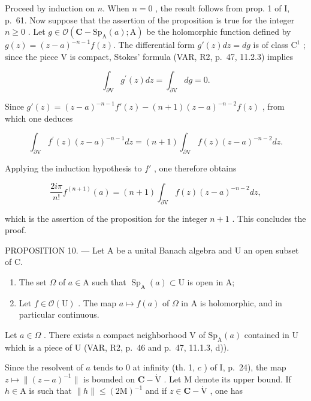 Proceed by induction on \(n\). When \(n = 0\) , the result follows from prop. 1 of I, p.~61. Now suppose that the assertion of the proposition is true for the integer \(n \geqslant 0\) . Let \(g \in \mathcal{O}(\mathbf{C} - \mathrm{Sp}_{\mathrm{A}}(a); \mathrm{A})\) be the holomorphic function defined by \(g(z) = (z - a)^{-n-1} f(z)\). The differential form \(g'(z) dz = dg\) is of class \(\mathrm{C}^1\) ; since the piece V is compact, Stokes' formula (VAR, R2, p.~47, 11.2.3) implies

\[
\int_ {\partial \mathrm{V}} g ^ {\prime} (z) d z = \int_ {\partial \mathrm{V}} d g = 0.
\]

Since \(g'(z) = (z - a)^{-n-1} f'(z) - (n+1)(z - a)^{-n-2} f(z)\) , from which one deduces

\[
\int_ {\partial \mathrm{V}} f ^ {\prime} (z) (z - a) ^ {- n - 1} d z = (n + 1) \int_ {\partial \mathrm{V}} f (z) (z - a) ^ {- n - 2} d z.
\]

Applying the induction hypothesis to \(f'\) , one therefore obtains

\[
\frac {2 i \pi}{n !} f ^ {(n + 1)} (a) = (n + 1) \int_ {\partial \mathrm{V}} f (z) (z - a) ^ {- n - 2} d z,
\]

which is the assertion of the proposition for the integer \(n+1\) . This concludes the proof.

PROPOSITION 10. --- Let A be a unital Banach algebra and U an open subset of C.

\begin{enumerate}
\def\labelenumi{\alph{enumi})}
\tightlist
\item
  The set \(\Omega\) of \(a \in \mathrm{A}\) such that \(\operatorname{Sp}_{\mathrm{A}}(a) \subset \mathrm{U}\) is open in A;
\item
  Let \(f \in \mathcal{O}(\mathrm{U})\) . The map \(a \mapsto f(a)\) of \(\Omega\) in A is holomorphic, and in particular continuous.
\end{enumerate}

Let \(a \in \Omega\) . There exists a compact neighborhood V of \(\mathrm{Sp}_{\mathrm{A}}(a)\) contained in U which is a piece of U (VAR, R2, p.~46 and p.~47, 11.1.3, d)).

Since the resolvent of \(a\) tends to 0 at infinity (th. 1, \(c\) ) of I, p.~24), the map \(z \mapsto \| (z - a)^{-1}\|\) is bounded on \(\mathbf{C} - \mathring{\mathrm{V}}\) . Let M denote its upper bound. If \(h \in \mathrm{A}\) is such that \(\| h\| \leqslant (2\mathrm{M})^{-1}\) and if \(z \in \mathbf{C} - \mathring{\mathrm{V}}\) , one has

